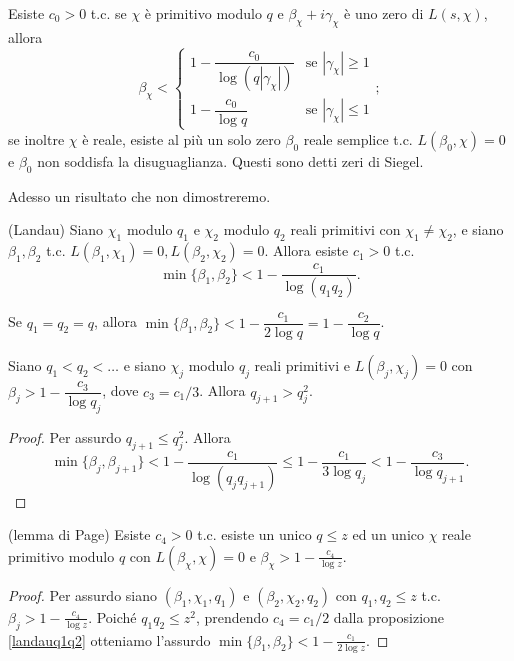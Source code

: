 \begin{prop}
  Esiste $c_0>0$ t.c. se $\chi$ è primitivo modulo $q$ e $\beta_\chi+i\gamma_\chi$ è uno zero di $L(s,\chi)$, allora
  $$\beta_\chi<\begin{cases}
    1-\dfrac{c_0}{\log(q|\gamma_\chi|)} &\mbox{se }|\gamma_\chi| \ge 1 \\
    1-\dfrac{c_0}{\log{q}} &\mbox{se } |\gamma_\chi| \le 1
\end{cases};$$
se inoltre $\chi$ è reale, esiste al più un solo zero $\beta_0$ reale semplice t.c. $L(\beta_0,\chi)=0$ e $\beta_0$ non soddisfa la disuguaglianza. Questi sono detti zeri di Siegel.
\end{prop}

Adesso un risultato che non dimostreremo.

\begin{prop} \label{landauq1q2}
  (Landau) Siano $\chi_1$ modulo $q_1$ e $\chi_2$ modulo $q_2$ reali primitivi con $\chi_1\not=\chi_2$, e siano $\beta_1,\beta_2$ t.c. $L(\beta_1,\chi_1)=0,L(\beta_2,\chi_2)=0$. Allora esiste $c_1>0$ t.c.
  $$\min\{\beta_1,\beta_2\}<1-\frac{c_1}{\log(q_1q_2)}.$$
\end{prop}

\begin{cor}
  Se $q_1=q_2=q$, allora $\min\{\beta_1,\beta_2\}<1-\dfrac{c_1}{2\log{q}}=1-\dfrac{c_2}{\log{q}}$.
\end{cor}

\begin{cor}
  Siano $q_1<q_2<\dots$ e siano $\chi_j$ modulo $q_j$ reali primitivi e $L(\beta_j,\chi_j)=0$ con $\beta_j>1-\dfrac{c_3}{\log{q_j}}$, dove $c_3=c_1/3$. Allora $q_{j+1}>q_j^2$.
\end{cor}

\begin{proof}
  Per assurdo $q_{j+1} \le q_j^2$. Allora
  $$\min\{\beta_j,\beta_{j+1}\}<1-\frac{c_1}{\log(q_jq_{j+1})} \le 1-\frac{c_1}{3\log{q_j}} < 1-\frac{c_3}{\log{q_{j+1}}}.$$
\end{proof}

\begin{cor}
  (lemma di Page) Esiste $c_4>0$ t.c. esiste un unico $q \le z$ ed un unico $\chi$ reale primitivo modulo $q$ con $L(\beta_\chi,\chi)=0$ e $\beta_\chi>1-\frac{c_4}{\log{z}}$.
\end{cor}

\begin{proof}
  Per assurdo siano $(\beta_1,\chi_1,q_1)$ e $(\beta_2,\chi_2,q_2)$ con $q_1,q_2 \le z$ t.c. $\beta_j>1-\frac{c_4}{\log{z}}$. Poiché $q_1q_2 \le z^2$, prendendo $c_4=c_1/2$ dalla proposizione \ref{landauq1q2} otteniamo l'assurdo $\min\{\beta_1,\beta_2\}<1-\frac{c_1}{2\log{z}}$.
\end{proof}

